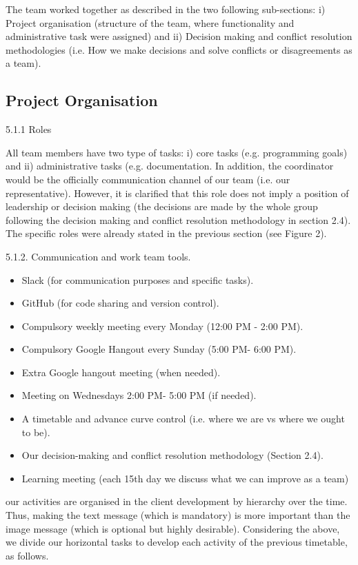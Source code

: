 The team worked together as described in the  two following sub-sections: i) Project organisation (structure of the team, where functionality and administrative task were assigned) and ii) Decision making and conflict resolution methodologies (i.e. How we make decisions and solve conflicts or disagreements as a team).

\subsection{Project Organisation}

5.1.1  Roles

All team members have two type of tasks: i) core tasks (e.g. programming goals) and ii) administrative tasks (e.g. documentation. In addition, the coordinator would be the officially communication channel of our team (i.e. our representative). However, it is clarified that this role does not imply a position of leadership or decision making (the decisions are made by the whole group following the decision making and conflict resolution methodology in section 2.4). The specific roles were already stated in the previous section (see Figure 2).

5.1.2.  Communication and work team tools.

\begin{itemize}
	\item Slack (for communication purposes and specific tasks).
	\item GitHub (for code sharing and version control).
	\item Compulsory weekly meeting every Monday (12:00 PM - 2:00 PM).
	\item Compulsory Google Hangout every Sunday (5:00 PM- 6:00 PM).
	\item Extra Google hangout meeting (when needed).
	\item Meeting on Wednesdays 2:00 PM- 5:00 PM (if needed). 
	\item A timetable and advance curve control (i.e. where we are vs where we ought to be).
	\item Our decision-making and conflict resolution methodology (Section 2.4).
	\item Learning meeting (each 15th day we discuss what we can improve as a team)
\end{itemize}


our activities are organised in the client development by hierarchy over the time. Thus, making the text message (which is mandatory) is more important than the image message (which is optional but highly desirable). Considering the above, we divide our horizontal tasks to develop each activity of the previous timetable, as follows.



